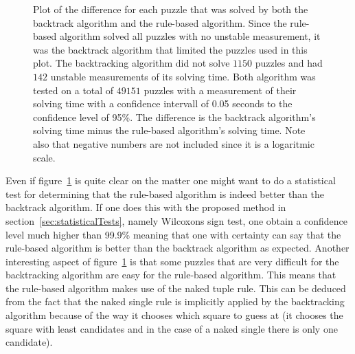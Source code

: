 \documentclass[a4paper,11pt]{kth-mag}
\begin{document}
\begin{figure}[here] 
\noindent{}
\vspace{-15pt}
\caption{Plot of the difference for each puzzle that was solved by both the backtrack algorithm and the rule-based algorithm. Since the rule-based algorithm solved all puzzles with no unstable measurement, it was the backtrack algorithm that limited the puzzles used in this plot. The backtracking algorithm did not solve $1150$ puzzles and had $142$ unstable measurements of its solving time. Both algorithm was tested on a total of $49151$ puzzles with a measurement of their solving time with a confidence intervall of 0.05 seconds to the confidence level of 95\%.
The difference is the backtrack algorithm's solving time minus the rule-based algorithm's solving time. Note also that negative numbers are not included since it is a logaritmic scale.}
\label{fig:comparison}
\end{figure}

Even if figure~\ref{fig:comparison} is quite clear on the matter one might want to do a statistical test for determining that the rule-based algorithm is indeed better than the backtrack algorithm.
If one does this with the proposed method in section~\ref{sec:statisticalTests}, namely Wilcoxons sign test, one obtain a confidence level much higher than 99.9\% meaning that one with certainty can say that the rule-based algorithm is better than the backtrack algorithm as expected.
Another interesting aspect of figure~\ref{fig:comparison} is that some puzzles that are very difficult for the backtracking algorithm are easy for the rule-based algorithm.
This means that the rule-based algorithm makes use of the naked tuple rule.
This can be deduced from the fact that the naked single rule is implicitly applied by the backtracking algorithm because of the way it chooses which square to guess at (it chooses the square with least candidates and in the case of a naked single there is only one candidate).
\end{document}

